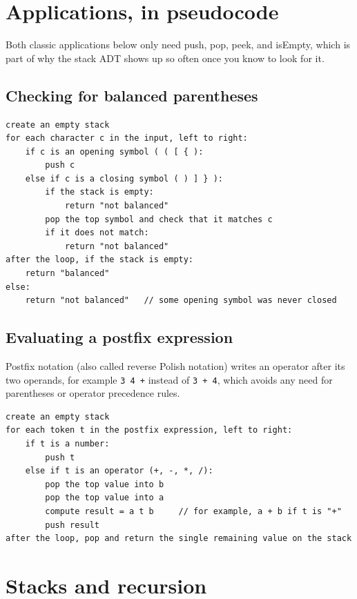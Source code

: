 \documentclass[11pt]{article}
\begin{document}
\section{Applications, in pseudocode}

Both classic applications below only need push, pop, peek, and isEmpty, which is part of
why the stack ADT shows up so often once you know to look for it.

\subsection*{Checking for balanced parentheses}

\begin{lstlisting}[style=pseudo]
create an empty stack
for each character c in the input, left to right:
    if c is an opening symbol ( ( [ { ):
        push c
    else if c is a closing symbol ( ) ] } ):
        if the stack is empty:
            return "not balanced"
        pop the top symbol and check that it matches c
        if it does not match:
            return "not balanced"
after the loop, if the stack is empty:
    return "balanced"
else:
    return "not balanced"   // some opening symbol was never closed
\end{lstlisting}

\subsection*{Evaluating a postfix expression}

Postfix notation (also called reverse Polish notation) writes an operator after its two
operands, for example \texttt{3 4 +} instead of \texttt{3 + 4}, which avoids any need for
parentheses or operator precedence rules.

\begin{lstlisting}[style=pseudo]
create an empty stack
for each token t in the postfix expression, left to right:
    if t is a number:
        push t
    else if t is an operator (+, -, *, /):
        pop the top value into b
        pop the top value into a
        compute result = a t b     // for example, a + b if t is "+"
        push result
after the loop, pop and return the single remaining value on the stack
\end{lstlisting}

\section{Stacks and recursion}
\end{document}
